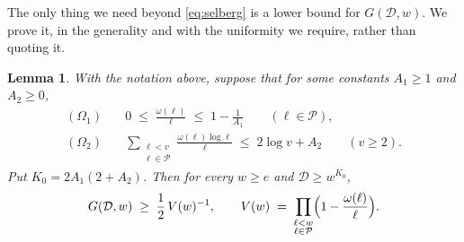 \documentclass[10pt]{article}
\newtheorem{lemma}{Lemma}
\theoremstyle{definition}
\theoremstyle{remark}
\begin{document}
The only thing we need beyond \eqref{eq:selberg} is a lower bound for
$G(\mathcal{D}, w)$. We prove it, in the generality and with the uniformity we
require, rather than quoting it.

\begin{lemma}\label{lem:G}
With the notation above, suppose that for some constants $A_1 \ge 1$ and
$A_2 \ge 0$,
\begin{align}
  (\Omega_1)\quad & 0 \;\le\; \frac{\omega(\ell)}{\ell}
    \;\le\; 1 - \frac{1}{A_1} \qquad (\ell \in \mathcal{P}),
    \label{eq:Om1}\\
  (\Omega_2)\quad & \sum_{\substack{\ell < v \\ \ell \in \mathcal{P}}}
    \frac{\omega(\ell)\log\ell}{\ell} \;\le\; 2\log v + A_2
    \qquad (v \ge 2).
    \label{eq:Om2}
\end{align}
Put $K_0 = 2A_1(2 + A_2)$. Then for every $w \ge e$ and
$\mathcal{D} \ge w^{K_0}$,
\[
  G(\mathcal{D}, w) \;\ge\; \frac{1}{2}\,V(w)^{-1},
  \qquad
  V(w) \;=\; \prod_{\substack{\ell < w \\ \ell \in \mathcal{P}}}
    \Bigl(1 - \frac{\omega(\ell)}{\ell}\Bigr).
\]
\end{lemma}
\end{document}
